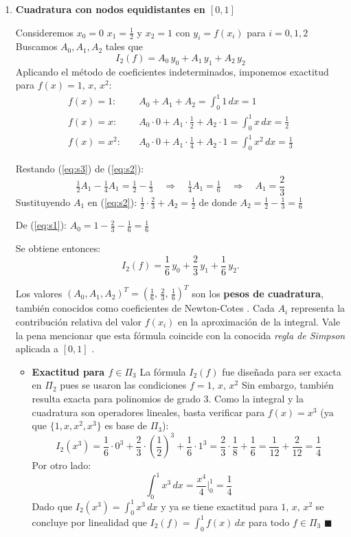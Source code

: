 \documentclass[12pt]{article}
\begin{document}
\begin{enumerate}
	\item \textbf{Cuadratura con nodos equidistantes en $[0,1]$}

	Consideremos $x_0=0$ $x_1=\tfrac{1}{2}$ y $x_2=1$ con $y_i = f(x_i)$ para $i=0,1,2$ Buscamos $A_0, A_1, A_2$ tales que
	\[
	I_2(f) = A_0\,y_0 + A_1\,y_1 + A_2\,y_2
	\]
	Aplicando el método de coeficientes indeterminados, imponemos exactitud para $f(x) = 1,\, x,\, x^2$:
	\begin{align}
		f(x)=1:   &\quad A_0 + A_1 + A_2 = \int_0^1 1\,dx = 1 \label{eq:s1}\\[4pt]
		f(x)=x:   &\quad A_0\cdot 0 + A_1\cdot\tfrac{1}{2} + A_2\cdot 1 = \int_0^1 x\,dx = \tfrac{1}{2} \label{eq:s2}\\[4pt]
		f(x)=x^2: &\quad A_0\cdot 0 + A_1\cdot\tfrac{1}{4} + A_2\cdot 1 = \int_0^1 x^2\,dx = \tfrac{1}{3} \label{eq:s3}
	\end{align}

	Restando (\ref{eq:s3}) de (\ref{eq:s2}):
	\[
	\tfrac{1}{2}A_1 - \tfrac{1}{4}A_1 = \tfrac{1}{2} - \tfrac{1}{3} \quad\Longrightarrow\quad \tfrac{1}{4}A_1 = \tfrac{1}{6} \quad\Longrightarrow\quad A_1 = \frac{2}{3}
	\]
	Sustituyendo $A_1$ en (\ref{eq:s2}): $\tfrac{1}{2}\cdot\tfrac{2}{3} + A_2 = \tfrac{1}{2}$ de donde $A_2 = \tfrac{1}{2} - \tfrac{1}{3} = \tfrac{1}{6}$

	De (\ref{eq:s1}): $A_0 = 1 - \tfrac{2}{3} - \tfrac{1}{6} = \tfrac{1}{6}$

	Se obtiene entonces:
	\[
	\boxed{I_2(f) = \frac{1}{6}\,y_0 + \frac{2}{3}\,y_1 + \frac{1}{6}\,y_2.}
	\]

	Los valores $(A_0,A_1,A_2)^T = \left(\tfrac{1}{6},\,\tfrac{2}{3},\,\tfrac{1}{6}\right)^T$ son los \textbf{pesos de cuadratura}, también conocidos como coeficientes de Newton-Cotes \cite{mathworld_newtoncotes}. Cada $A_i$ representa la contribución relativa del valor $f(x_i)$ en la aproximación de la integral. Vale la pena mencionar que esta fórmula coincide con la conocida \textit{regla de Simpson} aplicada a $[0,1]$ \cite{cheney08, burden02}.

	\begin{itemize}
		\item \textbf{Exactitud para $f \in \Pi_3$} La fórmula $I_2(f)$ fue diseñada para ser exacta en $\Pi_2$ pues se usaron las condiciones $f=1,\,x,\,x^2$ Sin embargo, también resulta exacta para polinomios de grado 3. Como la integral y la cuadratura son operadores lineales, basta verificar para $f(x) = x^3$ (ya que $\{1,x,x^2,x^3\}$ es base de $\Pi_3$):
		\[
		I_2(x^3) = \frac{1}{6}\cdot 0^3 + \frac{2}{3}\cdot\left(\frac{1}{2}\right)^3 + \frac{1}{6}\cdot 1^3 = \frac{2}{3}\cdot\frac{1}{8} + \frac{1}{6} = \frac{1}{12} + \frac{2}{12} = \frac{1}{4}
		\]
		Por otro lado:
		\[
		\int_0^1 x^3\,dx = \frac{x^4}{4}\bigg|_0^1 = \frac{1}{4}
		\]
		Dado que $I_2(x^3) = \int_0^1 x^3\,dx$ y ya se tiene exactitud para $1,\,x,\,x^2$ se concluye por linealidad que $I_2(f) = \int_0^1 f(x)\,dx$ para todo $f\in\Pi_3$ $\blacksquare$


\end{itemize}
\end{enumerate}
\end{document}
